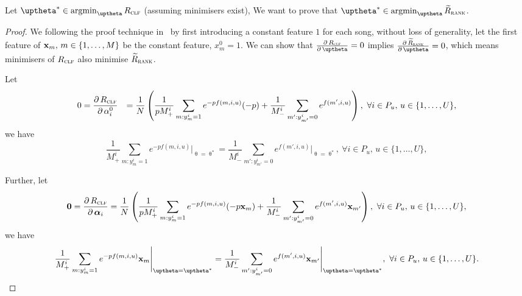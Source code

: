 Let $\uptheta^* \in \argmin_{\uptheta} R_\textsc{clf}$ (assuming minimisers exist),
We want to prove that $\uptheta^* \in \argmin_{\uptheta} \widetilde R_\textsc{rank}$.

\begin{proof}
We following the proof technique in~\cite{ertekin2011equivalence}
by first introducing a constant feature $1$ for each song,
without loss of generality, let the first feature of $\mathbf{x}_m, \, m \in \{1,\dots,M\}$ be the constant feature, \ie $x_m^0 = 1$.
We can show that
$\frac{\partial \, R_\textsc{clf}} {\partial \, \uptheta} = 0$ implies
$\frac{\partial \, \widetilde R_\textsc{rank}} {\partial \, \uptheta} = 0$,
which means minimisers of $R_\textsc{clf}$ also minimise $\widetilde R_\textsc{rank}$.

Let 
\begin{equation*}
\begin{aligned}
0 
&= \frac{\partial \, R_\textsc{clf}} {\partial \, \alpha_i^0}
&= \frac{1}{N} \left( 
   \frac{1}{p M_+^i} \sum_{m: y_m^i = 1} e^{-p f(m, i, u)} (-p)
   + \frac{1}{M_-^i} \sum_{m': y_{m'}^i = 0} e^{f(m', i, u)} \right),
\ \forall i \in P_u, \, u \in \{1,\dots,U\},
\end{aligned}
\end{equation*}
we have
\begin{equation}
\label{eq:eq1}
\frac{1}{M_+^i} \sum_{m: y_m^i = 1} e^{-p f(m, i, u)} \Bigg|_{\uptheta = \uptheta^*}
= \frac{1}{M_-^i} \sum_{m': y_{m'}^i = 0} e^{f(m', i, u)} \Bigg|_{\uptheta = \uptheta^*}, 
\ \forall i \in P_u, \, u \in \{1,\dots,U\},
\end{equation}

Further, let
\begin{equation*}
\mathbf{0} 
= \frac{\partial \, R_\textsc{clf}} {\partial \, {\bm{\alpha}}_i} 
= \frac{1}{N} \left( 
   \frac{1}{p M_+^i} \sum_{m: y_m^i = 1} e^{-p f(m, i, u)} (-p \mathbf{x}_m)
   + \frac{1}{M_-^i} \sum_{m': y_{m'}^i = 0} e^{f(m', i, u)} \mathbf{x}_{m'} \right),
\ \forall i \in P_u, \, u \in \{1,\dots,U\},
\end{equation*}
we have
\begin{equation}
\label{eq:eq2}
\frac{1}{M_+^i} \sum_{m: y_m^i = 1} e^{-p f(m, i, u)} \x_m \Bigg|_{\uptheta = \uptheta^*}
= \frac{1}{M_-^i} \sum_{m': y_{m'}^i = 0} e^{f(m', i, u)} \x_{m'} \Bigg|_{\uptheta = \uptheta^*},
\ \forall i \in P_u, \, u \in \{1,\dots,U\}.
\end{equation}


\end{proof}
